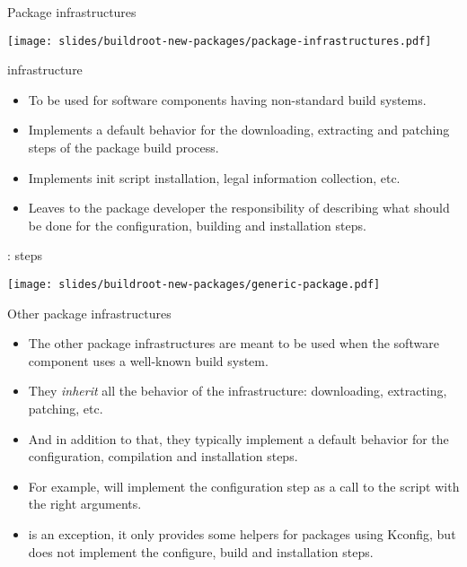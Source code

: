 \begin{frame}{Package infrastructures}
  \begin{center}
    \texttt{[image: slides/buildroot-new-packages/package-infrastructures.pdf]}
  \end{center}
\end{frame}

\begin{frame}{ infrastructure}
  \begin{itemize}
  \item To be used for software components having non-standard build
    systems.
  \item Implements a default behavior for the downloading, extracting
    and patching steps of the package build process.
  \item Implements init script installation, legal information
    collection, etc.
  \item Leaves to the package developer the responsibility of
    describing what should be done for the configuration, building and
    installation steps.
  \end{itemize}
\end{frame}

\begin{frame}{: steps}
  \begin{center}
    \texttt{[image: slides/buildroot-new-packages/generic-package.pdf]}
  \end{center}
\end{frame}

\begin{frame}{Other package infrastructures}
  \begin{itemize}
  \item The other package infrastructures are meant to be used when
    the software component uses a well-known build system.
  \item They {\em inherit} all the behavior of the
     infrastructure: downloading, extracting,
    patching, etc.
  \item And in addition to that, they typically implement a default
    behavior for the configuration, compilation and installation
    steps.
  \item For example,  will implement the
    configuration step as a call to the  script with
    the right arguments.
  \item {} is an exception, it only provides some
    helpers for packages using Kconfig, but does not implement the
    configure, build and installation steps.
  \end{itemize}
\end{frame}


